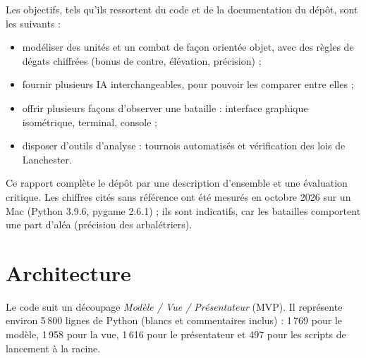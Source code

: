 \documentclass[11pt,a4paper]{article}
\begin{document}
Les objectifs, tels qu'ils ressortent du code et de la documentation du d\'ep\^ot, sont les suivants :
\begin{itemize}
  \item mod\'eliser des unit\'es et un combat de fa\c con orient\'ee objet, avec des r\`egles de d\'egats chiffr\'ees
        (bonus de contre, \'el\'evation, pr\'ecision) ;
  \item fournir plusieurs IA interchangeables, pour pouvoir les comparer entre elles ;
  \item offrir plusieurs fa\c cons d'observer une bataille : interface graphique isom\'etrique, terminal, console ;
  \item disposer d'outils d'analyse : tournois automatis\'es et v\'erification des lois de Lanchester.
\end{itemize}

Ce rapport compl\`ete le d\'ep\^ot par une description d'ensemble et une \'evaluation critique. Les chiffres
cit\'es sans r\'ef\'erence ont \'et\'e mesur\'es en octobre 2026 sur un Mac (Python 3.9.6, pygame 2.6.1) ; ils sont
indicatifs, car les batailles comportent une part d'al\'ea (pr\'ecision des arbal\'etriers).

\section{Architecture}

Le code suit un d\'ecoupage \emph{Mod\`ele / Vue / Pr\'esentateur} (MVP). Il repr\'esente environ 5\,800 lignes de Python
(blancs et commentaires inclus) : 1\,769 pour le mod\`ele, 1\,958 pour la vue, 1\,616 pour le pr\'esentateur et 497 pour
les scripts de lancement \`a la racine.
\end{document}
